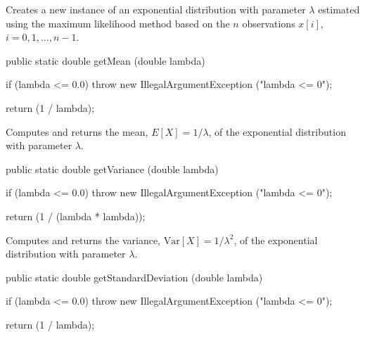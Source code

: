 \begin{tabb}
   Creates a new instance of an exponential distribution with parameter
   $\lambda$ estimated using
   the maximum likelihood method based on the $n$ observations $x[i]$,
   $i = 0, 1, \ldots, n-1$.
\end{tabb}
\begin{htmlonly}
\end{htmlonly}
\begin{code}

   public static double getMean (double lambda)\begin{hide} {
      if (lambda <= 0.0)
         throw new IllegalArgumentException ("lambda <= 0");

      return (1 / lambda);
   }\end{hide}
\end{code}
\begin{tabb}  Computes and returns the mean, $E[X] = 1/\lambda$,
   of the exponential distribution with parameter $\lambda$.
\end{tabb}
\begin{htmlonly}
\end{htmlonly}
\begin{code}

   public static double getVariance (double lambda)\begin{hide} {
      if (lambda <= 0.0)
         throw new IllegalArgumentException ("lambda <= 0");

      return (1 / (lambda * lambda));
   }\end{hide}
\end{code}
\begin{tabb}  Computes and returns the variance, $\mbox{Var}[X] = 1/\lambda^2$,
   of the exponential distribution with parameter $\lambda$.
\end{tabb}
\begin{htmlonly}
\end{htmlonly}
\begin{code}

   public static double getStandardDeviation (double lambda)\begin{hide} {
      if (lambda <= 0.0)
         throw new IllegalArgumentException ("lambda <= 0");

      return (1 / lambda);
   }\end{hide}
\end{code}
